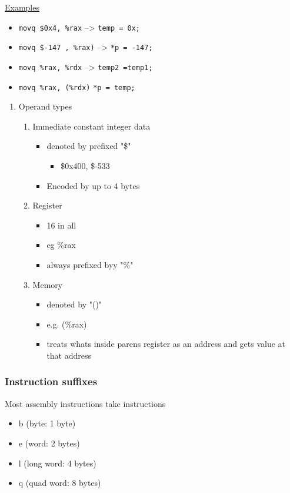 \documentclass[11pt]{article}
\begin{document}
\uline{Examples}
\begin{itemize}
\item \texttt{movq \$0x4, \%rax} --> \texttt{temp = 0x;}
\item \texttt{movq \$-147 , \%rax)} --> \texttt{*p = -147;}
\item \texttt{movq \%rax, \%rdx} --> \texttt{temp2 =temp1;}
\item \texttt{movq \%rax, (\%rdx)} \texttt{*p = temp;}
\end{itemize}
\begin{enumerate}
\item Operand types
\label{sec-6-1-1-0-1}
\begin{enumerate}
\item Immediate
\label{sec-6-1-1-0-1-1}
constant integer data 
\begin{itemize}
\item denoted by prefixed "\$"
\begin{itemize}
\item \$0x400, \$-533
\end{itemize}
\item Encoded by up to 4 bytes
\end{itemize}
\item Register
\label{sec-6-1-1-0-1-2}
\begin{itemize}
\item 16 in all
\item eg \%rax
\item always prefixed byy "\%"
\end{itemize}
\item Memory
\label{sec-6-1-1-0-1-3}
\begin{itemize}
\item denoted by "()"
\item e.g. (\%rax)
\item treats whats inside parens register as an address and gets value at that address
\end{itemize}
\end{enumerate}
\end{enumerate}
\subsubsection{Instruction suffixes}
\label{sec-6-1-2}
Most assembly instructions take instructions
\begin{itemize}
\item b (byte: 1 byte)
\item e (word: 2 bytes)
\item l (long word: 4 bytes)
\item q (quad word: 8 bytes)
\end{itemize}
\end{document}
